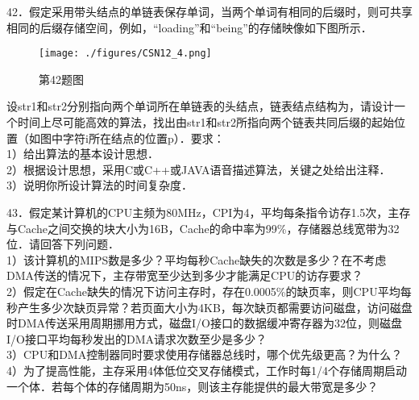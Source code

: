 42．假定采用带头结点的单链表保存单词，当两个单词有相同的后缀时，则可共享相同的后缀存储空间，例如，“loading”和“being”的存储映像如下图所示．\\
\begin{figure}[ht]
\centering
\texttt{[image: ./figures/CSN12\_4.png]}
\caption{第42题图} \label{CSN12_fig4}
\end{figure}
设str1和str2分别指向两个单词所在单链表的头结点，链表结点结构为，请设计一个时间上尽可能高效的算法，找出由str1和str2所指向两个链表共同后缀的起始位置（如图中字符i所在结点的位置p）．要求：\\
1）给出算法的基本设计思想．\\
2）根据设计思想，采用C或C++或JAVA语音描述算法，关键之处给出注释．\\
3）说明你所设计算法的时间复杂度．

43．假定某计算机的CPU主频为80MHz，CPI为4，平均每条指令访存1.5次，主存与Cache之间交换的块大小为16B，Cache的命中率为99\%，存储器总线宽带为32位．请回答下列问题．\\
1）该计算机的MIPS数是多少？平均每秒Cache缺失的次数是多少？在不考虑DMA传送的情况下，主存带宽至少达到多少才能满足CPU的访存要求？\\
2）假定在Cache缺失的情况下访问主存时，存在0.0005\%的缺页率，则CPU平均每秒产生多少次缺页异常？若页面大小为4KB，每次缺页都需要访问磁盘，访问磁盘时DMA传送采用周期挪用方式，磁盘I/O接口的数据缓冲寄存器为32位，则磁盘I/O接口平均每秒发出的DMA请求次数至少是多少？\\
3）CPU和DMA控制器同时要求使用存储器总线时，哪个优先级更高？为什么？\\
4）为了提高性能，主存采用4体低位交叉存储模式，工作时每1/4个存储周期启动一个体．若每个体的存储周期为50ns，则该主存能提供的最大带宽是多少？

